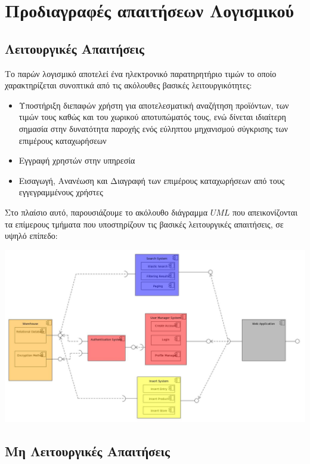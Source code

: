 \documentclass[12pt]{article}
\begin{document}
\section{Προδιαγραφές απαιτήσεων Λογισμικού}

\subsection{Λειτουργικές Απαιτήσεις}

Το παρών λογισμικό αποτελεί ένα ηλεκτρονικό παρατηρητήριο τιμών το οποίο χαρακτηρίζεται συνοπτικά από τις ακόλουθες βασικές λειτουργικότητες:

\begin{itemize}
\item Υποστήριξη διεπαφών χρήστη για αποτελεσματική αναζήτηση προϊόντων, των τιμών τους καθώς και του χωρικού αποτυπώματός τους, ενώ δίνεται ιδιαίτερη σημασία στην δυνατότητα παροχής ενός εύληπτου μηχανισμού σύγκρισης των επιμέρους καταχωρήσεων
\item Εγγραφή χρηστών στην υπηρεσία 
\item Εισαγωγή, Ανανέωση και Διαγραφή των επιμέρους καταχωρήσεων από τους εγγεγραμμένους χρήστες
\end{itemize}

Στο πλαίσιο αυτό, παρουσιάζουμε το ακόλουθο διάγραμμα $UML$ που απεικονίζονται τα επίμερους τμήματα που υποστηρίζουν τις βασικές λειτουργικές απαιτήσεις, σε υψηλό επίπεδο:

\begin{center}
\includegraphics[scale=0.34]{UML/componentDiagram.jpg}
\end{center}

\newpage

\subsection{Μη Λειτουργικές Απαιτήσεις}
\end{document}
